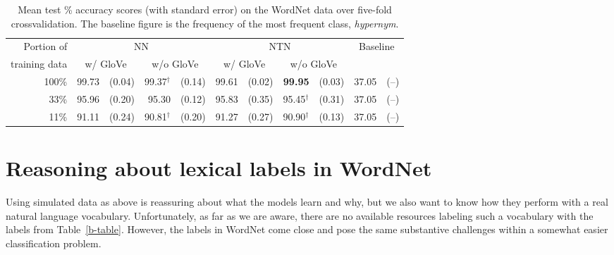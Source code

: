 \documentclass[letterpaper]{article}
\def\ii#1{\textit{#1}}
\begin{document}
\newcommand{\nodagger}{\phantom{$^\dagger$}}

\begin{table*}
\centering%
{
  \setlength{\tabcolsep}{15pt}
  \renewcommand{\arraystretch}{1.1}
  \begin{tabular}{r r@{ }r r@{ }r r@{ }r r@{ }r r@{ }r} 
    \toprule
     Portion of & \multicolumn{4}{c}{NN} & \multicolumn{4}{c}{NTN} & \multicolumn{2}{c}{Baseline}\\
     training data  & \multicolumn{2}{c}{w/ GloVe} & \multicolumn{2}{c}{w/o GloVe} & \multicolumn{2}{c}{w/ GloVe} & \multicolumn{2}{c}{w/o GloVe} \\
    \midrule
     100\%   & 99.73 &(0.04) & 99.37$^\dagger$ &(0.14)    & 99.61 &(0.02) & \textbf{99.95}\nodagger &(0.03) & 37.05 &(--)\\
     33\%    & 95.96 &(0.20) & 95.30\nodagger &(0.12)                & 95.83 &(0.35)          & 95.45$^\dagger$ &(0.31) & 37.05 &(--)\\
     11\%    & 91.11 &(0.24) & 90.81$^\dagger$ &(0.20)    & 91.27 &(0.27)          & 90.90$^\dagger$ &(0.13) & 37.05 &(--)\\
    \bottomrule
  \end{tabular}}
 \caption{Mean test \% accuracy scores (with standard error) on the WordNet data over five-fold crossvalidation. The baseline figure is the frequency of the most frequent class, \ii{hypernym}.\label{wn-table}} 
\end{table*}

\section{Reasoning about lexical labels in WordNet}\label{sec:wordnet}

Using simulated data as above is reassuring about what the models
learn and why, but we also want to know how they perform with a real
natural language vocabulary. Unfortunately, as far as we are aware,
there are no available resources labeling such a vocabulary with the
labels from Table~\ref{b-table}. However, the labels in WordNet
\cite{fellbaum2010wordnet,WordNet95} come close and pose the same substantive
challenges within a somewhat easier classification problem.

\end{document}

